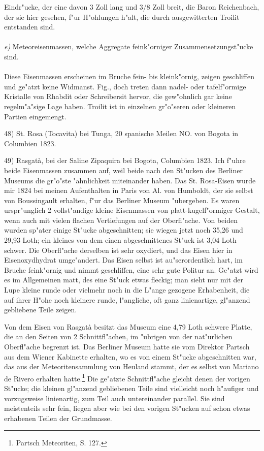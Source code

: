 \documentclass[a4paper, 11pt, oneside, german]{article}
\begin{document}
Eindr"ucke, der eine davon 3 Zoll lang und 3/8 Zoll breit, die Baron Reichenbach, der sie hier gesehen, f"ur H"ohlungen h"alt, die durch ausgewitterten Troilit entstanden sind.
\vspace{\medskipamount}
\paragraph{}
\emph{e)} Meteoreisenmassen, welche Aggregate feink"orniger Zusammensetzungst"ucke sind.
\vspace{\medskipamount}
\paragraph{}
Diese Eisenmassen erscheinen im Bruche fein- bis kleink"ornig, zeigen geschliffen und ge"atzt keine Widmanst. Fig., doch treten dann nadel- oder tafelf"ormige Kristalle von Rhabdit oder Schreibersit hervor, die gew"ohnlich gar keine regelm"a"sige Lage haben. Troilit ist in einzelnen gr"o"seren oder kleineren Partien eingemengt.

48) St. Rosa (Tocavita) bei Tunga, 20 spanische Meilen NO. von Bogota in Columbien 1823.

49) Rasgatà, bei der Saline Zipaquira bei Bogota, Columbien 1823. Ich f"uhre beide Eisenmassen zusammen auf, weil beide nach den St"ucken des Berliner Museums die gr"o"ste "ahnlichkeit miteinander haben. Das St. Rosa-Eisen wurde mir 1824 bei meinen Aufenthalten in Paris von Al. von Humboldt, der sie selbst von Boussingault erhalten, f"ur das Berliner Museum "ubergeben. Es waren urspr"unglich 2 vollst"andige kleine Eisenmassen von platt-kugelf"ormiger Gestalt, wenn auch mit vielen flachen Vertiefungen auf der Oberfl"ache. Von beiden wurden sp"ater einige St"ucke abgeschnitten; sie wiegen jetzt noch 35,26 und 29,93 Loth; ein kleines von dem einen abgeschnittenes St"uck ist 3,04 Loth schwer. Die Oberfl"ache derselben ist sehr oxydiert, und das Eisen hier in Eisenoxydhydrat umge"andert. Das Eisen selbst ist au"serordentlich hart, im Bruche feink"ornig und nimmt geschliffen, eine sehr gute Politur an. Ge"atzt wird es im Allgemeinen matt, des eine St"uck etwas fleckig; man sieht nur mit der Lupe kleine runde oder vielmehr noch in die L"ange gezogene Erhabenheit, die auf ihrer H"ohe noch kleinere runde, l"angliche, oft ganz linienartige, gl"anzend gebliebene Teile zeigen.

Von dem Eisen von Rasgatà besitzt das Museum eine 4,79 Loth schwere Platte, die an den Seiten von 2 Schnittfl"achen, im "ubrigen von der nat"urlichen Oberfl"ache begrenzt ist. Das Berliner Museum hatte sie vom Direktor Partsch aus dem Wiener Kabinette erhalten, wo es von einem St"ucke abgeschnitten war, das aus der Meteoritensammlung von Heuland stammt, der es selbst von Mariano de Rivero erhalten hatte.\footnote{Partsch Meteoriten, S. 127.} Die ge"atzte Schnittfl"ache gleicht denen der vorigen St"ucke; die kleinen gl"anzend gebliebenen Teile sind vielleicht noch h"aufiger und vorzugsweise linienartig, zum Teil auch untereinander parallel. Sie sind meistenteils sehr fein, liegen aber wie bei den vorigen St"ucken auf schon etwas erhabenen Teilen der Grundmasse.
\end{document}
